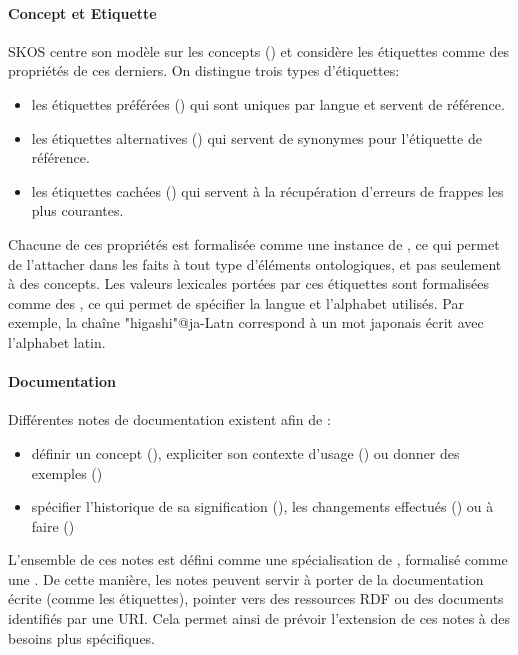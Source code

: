 \paragraph{Concept et Etiquette}
SKOS centre son modèle sur les concepts () et considère les étiquettes comme des propriétés de ces derniers. 
On distingue trois types d'étiquettes: 
\begin{itemize} 
	\item les étiquettes préférées () qui sont uniques par langue et servent de référence.
	\item les étiquettes alternatives () qui servent de synonymes pour l'étiquette de référence. 
	\item les étiquettes cachées () qui servent à la récupération d'erreurs de frappes les plus courantes. 
\end{itemize}
Chacune de ces propriétés est formalisée comme une instance de , ce qui permet de l'attacher dans les faits à tout type d'éléments ontologiques, et pas seulement à des concepts. 
Les valeurs lexicales portées par ces étiquettes sont formalisées comme des , ce qui permet de spécifier la langue et l'alphabet utilisés. 
Par exemple, la chaîne "higashi"@ja-Latn correspond à un mot japonais écrit avec l'alphabet latin.

\paragraph{Documentation}
Différentes notes de documentation existent afin de :
\begin{itemize}
	\item définir un concept (), expliciter son contexte d'usage () ou donner des exemples ()
	\item spécifier l'historique de sa signification (), les changements effectués () ou à faire ()
\end{itemize}
L'ensemble de ces notes est défini comme une spécialisation de , formalisé comme une . 
De cette manière, les notes peuvent servir à porter de la documentation écrite (comme les étiquettes), pointer vers des ressources RDF ou des documents identifiés par une URI. 
Cela permet ainsi de prévoir l'extension de ces notes à des besoins plus spécifiques.


